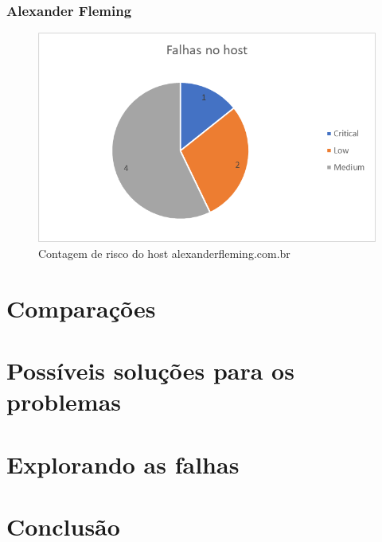 \documentclass[
	12pt,				%
	openright,			%
	twoside,			%
	a4paper,			%
	english,			%
	french,				%
	spanish,			%
	brazil				%
	]{abntex2}
\begin{document}
\subsection{Alexander Fleming}
\begin{figure}[h]
	\centering
	\includegraphics[width=0.7\linewidth]{Imagens/AlexanderFleming}
	\caption[Alexander Fleming]{Contagem de risco do host alexanderfleming.com.br}
	\label{fig:alexanderfleming}
\end{figure}

\chapter{Comparações}

\chapter{Possíveis soluções para os problemas}

\chapter{Explorando as falhas}


\chapter{Conclusão}

\postextual


%

\printindex
\end{document}
